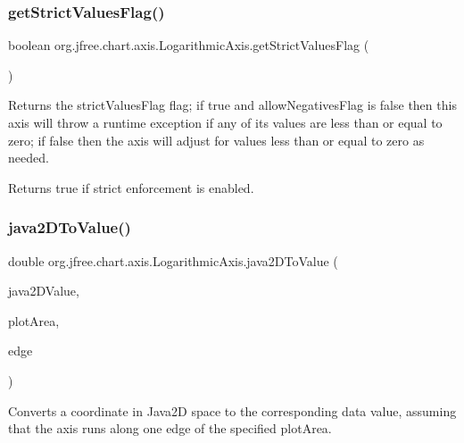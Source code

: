 \subsubsection{\texorpdfstring{get\+Strict\+Values\+Flag()}{getStrictValuesFlag()}}
{\footnotesize\ttfamily boolean org.\+jfree.\+chart.\+axis.\+Logarithmic\+Axis.\+get\+Strict\+Values\+Flag (\begin{DoxyParamCaption}{ }\end{DoxyParamCaption})}

Returns the \textquotesingle{}strict\+Values\+Flag\textquotesingle{} flag; if true and \textquotesingle{}allow\+Negatives\+Flag\textquotesingle{} is false then this axis will throw a runtime exception if any of its values are less than or equal to zero; if false then the axis will adjust for values less than or equal to zero as needed.

\begin{DoxyReturn}{Returns}
{\ttfamily true} if strict enforcement is enabled. 
\end{DoxyReturn}
\mbox{\label{classorg_1_1jfree_1_1chart_1_1axis_1_1_logarithmic_axis_a1152fedcc279d265ff15e36794f7aef8}} 
\subsubsection{\texorpdfstring{java2\+D\+To\+Value()}{java2DToValue()}}
{\footnotesize\ttfamily double org.\+jfree.\+chart.\+axis.\+Logarithmic\+Axis.\+java2\+D\+To\+Value (\begin{DoxyParamCaption}\item[{double}]{java2\+D\+Value,  }\item[{Rectangle2D}]{plot\+Area,  }\item[{Rectangle\+Edge}]{edge }\end{DoxyParamCaption})}

Converts a coordinate in Java2D space to the corresponding data value, assuming that the axis runs along one edge of the specified plot\+Area.


